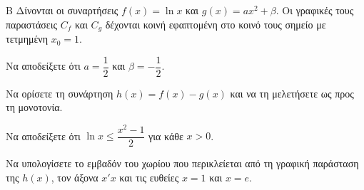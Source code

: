 \begin{thema}{Β}
Δίνονται οι συναρτήσεις $f(x) = \ln x$ και $g(x) = a x^2 + \beta$. Οι γραφικές τους παραστάσεις $C_f$ και $C_g$ δέχονται κοινή εφαπτομένη στο κοινό τους σημείο με τετμημένη $x_0=1$.
\begin{erwthma}
  \item Να αποδείξετε ότι $a=\dfrac{1}{2}$ και $\beta=-\dfrac{1}{2}$.
  \item Να ορίσετε τη συνάρτηση $h(x) = f(x) - g(x)$ και να τη μελετήσετε ως προς τη μονοτονία.
  \item Να αποδείξετε ότι $\ln x \le \dfrac{x^2-1}{2}$ για κάθε $x > 0$.
  \item Να υπολογίσετε το εμβαδόν του χωρίου που περικλείεται από τη γραφική παράσταση της $h(x)$, τον άξονα $x'x$ και τις ευθείες $x=1$ και $x=e$.
\end{erwthma}
\end{thema}
